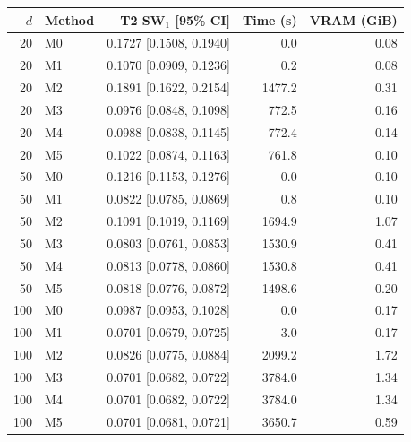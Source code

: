 \begin{tabular}{rlrrr}
\hline
$d$ & Method & T2 SW$_1$ [95\% CI] & Time (s) & VRAM (GiB) \\
\hline
20 & M0 & 0.1727 [0.1508, 0.1940] & 0.0 & 0.08 \\
20 & M1 & 0.1070 [0.0909, 0.1236] & 0.2 & 0.08 \\
20 & M2 & 0.1891 [0.1622, 0.2154] & 1477.2 & 0.31 \\
20 & M3 & 0.0976 [0.0848, 0.1098] & 772.5 & 0.16 \\
20 & M4 & 0.0988 [0.0838, 0.1145] & 772.4 & 0.14 \\
20 & M5 & 0.1022 [0.0874, 0.1163] & 761.8 & 0.10 \\
50 & M0 & 0.1216 [0.1153, 0.1276] & 0.0 & 0.10 \\
50 & M1 & 0.0822 [0.0785, 0.0869] & 0.8 & 0.10 \\
50 & M2 & 0.1091 [0.1019, 0.1169] & 1694.9 & 1.07 \\
50 & M3 & 0.0803 [0.0761, 0.0853] & 1530.9 & 0.41 \\
50 & M4 & 0.0813 [0.0778, 0.0860] & 1530.8 & 0.41 \\
50 & M5 & 0.0818 [0.0776, 0.0872] & 1498.6 & 0.20 \\
100 & M0 & 0.0987 [0.0953, 0.1028] & 0.0 & 0.17 \\
100 & M1 & 0.0701 [0.0679, 0.0725] & 3.0 & 0.17 \\
100 & M2 & 0.0826 [0.0775, 0.0884] & 2099.2 & 1.72 \\
100 & M3 & 0.0701 [0.0682, 0.0722] & 3784.0 & 1.34 \\
100 & M4 & 0.0701 [0.0682, 0.0722] & 3784.0 & 1.34 \\
100 & M5 & 0.0701 [0.0681, 0.0721] & 3650.7 & 0.59 \\
\hline
\end{tabular}

